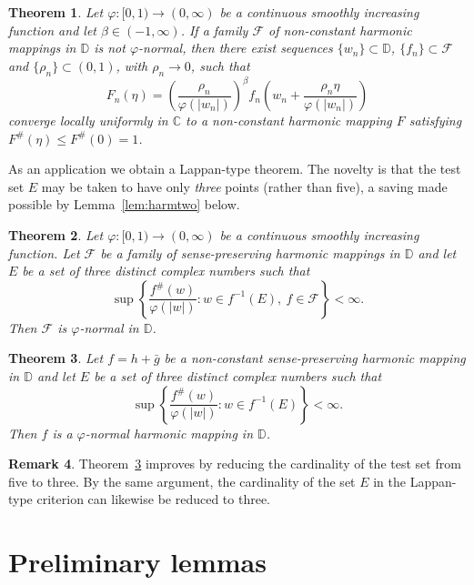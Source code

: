 \documentclass[11pt,reqno]{amsart}
\newtheorem{theorem}{Theorem}[section]
\theoremstyle{definition}
\newtheorem{remark}[theorem]{Remark}
\newcommand{\D}{\mathbb{D}}
\newcommand{\C}{\mathbb{C}}
\begin{document}
\begin{theorem}\label{thm:rescalefamily}
Let $\varphi\colon[0,1)\to(0,\infty)$ be a continuous smoothly increasing function and let
$\beta\in(-1,\infty)$. If a family $\mathcal F$ of non-constant harmonic mappings in $\D$ is
\emph{not} $\varphi$-normal, then there exist sequences $\{w_{n}\}\subset\D$,
$\{f_{n}\}\subset\mathcal F$ and $\{\rho_{n}\}\subset(0,1)$, with $\rho_{n}\to0$, such that
\[
F_{n}(\eta)=\left(\frac{\rho_{n}}{\varphi(|w_{n}|)}\right)^{\beta}
f_{n}\!\left(w_{n}+\frac{\rho_{n}\eta}{\varphi(|w_{n}|)}\right)
\]
converge locally uniformly in $\C$ to a non-constant harmonic mapping $F$ satisfying
$F^{\#}(\eta)\le F^{\#}(0)=1$.
\end{theorem}

As an application we obtain a Lappan-type theorem. The novelty is that the test set $E$ may
be taken to have only \emph{three} points (rather than five), a saving made possible by
Lemma~\ref{lem:harmtwo} below.

\begin{theorem}\label{thm:lappanfamily}
Let $\varphi\colon[0,1)\to(0,\infty)$ be a continuous smoothly increasing function. Let
$\mathcal F$ be a family of sense-preserving harmonic mappings in $\D$ and let $E$ be a set
of three distinct complex numbers such that
\[
\sup\left\{\frac{f^{\#}(w)}{\varphi(|w|)}:w\in f^{-1}(E),\ f\in\mathcal F\right\}<\infty.
\]
Then $\mathcal F$ is $\varphi$-normal in $\D$.
\end{theorem}

\begin{theorem}\label{thm:lappansingle}
Let $f=h+\bar g$ be a non-constant sense-preserving harmonic mapping in $\D$ and let $E$ be
a set of three distinct complex numbers such that
\[
\sup\left\{\frac{f^{\#}(w)}{\varphi(|w|)}:w\in f^{-1}(E)\right\}<\infty.
\]
Then $f$ is a $\varphi$-normal harmonic mapping in $\D$.
\end{theorem}

\begin{remark}\label{rem:improveBDP}
Theorem~\ref{thm:lappansingle} improves \cite[Theorem~1.6]{BDP} by reducing the cardinality
of the test set from five to three. By the same argument, the cardinality of the set $E$ in
the Lappan-type criterion \cite[Theorem~1.6]{BT} can likewise be reduced to three.
\end{remark}

\section{Preliminary lemmas}
\end{document}
